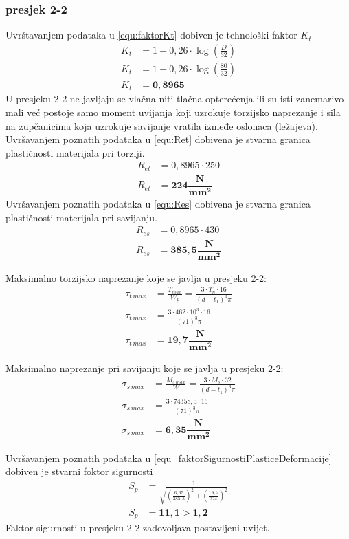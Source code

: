 \documentclass[11pt,a4paper]{report}
\begin{document}
\subsubsection{presjek 2-2}
Uvrštavanjem podataka u \eqref{equ:faktorKt} dobiven je tehnološki faktor $K_t$
\begin{align*}
K_t&=1-0,26\cdot \log \left( \frac{D}{32} \right)\\
K_t&=1-0,26\cdot \log \left( \frac{80}{32} \right)\\
K_t&=\mathbf{0,8965}
\end{align*}
U presjeku 2-2 ne javljaju se vlačna niti tlačna opterećenja ili su isti zanemarivo mali već postoje samo moment uvijanja koji uzrokuje torzijsko naprezanje i sila na zupčanicima koja uzrokuje savijanje vratila izmeđe oslonaca (ležajeva).
Uvršavanjem poznatih podataka u \eqref{equ:Ret} dobivena je stvarna granica plastičnosti materijala pri torziji.
\begin{align*}
R_{et}&=0,8965 \cdot 250\\
R_{et}&=\mathbf{224 \dfrac{N}{mm^2}}
\end{align*}
Uvršavanjem poznatih podataka u \eqref{equ:Res} dobivena je stvarna granica plastičnosti materijala pri savijanju.
\begin{align*}
R_{es}&=0,8965 \cdot 430\\
R_{es}&=\mathbf{385,5 \dfrac{N}{mm^2}}
\end{align*}

Maksimalno torzijsko naprezanje koje se javlja u presjeku 2-2:
\begin{align*}
\tau_{t \, max}&=\frac{T_{max}}{W_p}=\frac{3 \cdot T_n \cdot 16}{(d-t_1)^3 \pi}\\
\tau_{t \, max}&=\frac{3 \cdot 462\cdot 10^3 \cdot 16}{(71)^3 \pi}\\
\tau_{t \, max}&=\mathbf{19,7 \dfrac{N}{mm^2}}
\end{align*}

Maksimalno naprezanje pri savijanju koje se javlja u presjeku 2-2:
\begin{align*}
\sigma_{s \, max}&=\frac{M_{s \, max}}{W}=\frac{3 \cdot M_s \cdot 32}{(d-t_1)^3 \pi}\\
\sigma_{s \, max}&=\frac{3 \cdot 74358,5  \cdot 16}{(71)^3 \pi}\\
\sigma_{s \, max}&=\mathbf{6,35 \dfrac{N}{mm^2}}
\end{align*}

Uvršavanjem poznatih podataka u \eqref{equ_faktorSigurnostiPlasticeDeformacije} dobiven je stvarni foktor sigurnosti
\begin{align*}
S_p&=\frac{1}{\sqrt{\left( \frac{6,35}{385,5}\right)^2+ \left(\frac{19,7}{224}\right)^2}}\\
S_p&=\mathbf{11,1 > 1,2}
\end{align*}
Faktor sigurnosti u presjeku 2-2 zadovoljava postavljeni uvijet.
\end{document}
